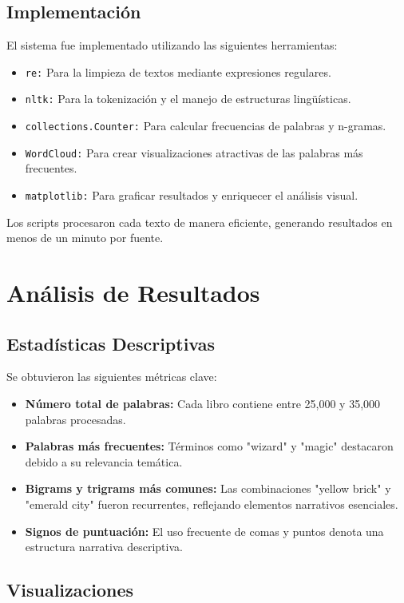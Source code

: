 \documentclass[conference]{IEEEtran}
\begin{document}
\subsection{Implementación}

El sistema fue implementado utilizando las siguientes herramientas:
\begin{itemize}
    \item \texttt{re:} Para la limpieza de textos mediante expresiones regulares.
    \item \texttt{nltk:} Para la tokenización y el manejo de estructuras lingüísticas.
    \item \texttt{collections.Counter:} Para calcular frecuencias de palabras y n-gramas.
    \item \texttt{WordCloud:} Para crear visualizaciones atractivas de las palabras más frecuentes.
    \item \texttt{matplotlib:} Para graficar resultados y enriquecer el análisis visual.
\end{itemize}
Los scripts procesaron cada texto de manera eficiente, generando resultados en menos de un minuto por fuente.


\section{Análisis de Resultados}

\subsection{Estadísticas Descriptivas}

Se obtuvieron las siguientes métricas clave:
\begin{itemize}
    \item \textbf{Número total de palabras:} Cada libro contiene entre 25,000 y 35,000 palabras procesadas.
    \item \textbf{Palabras más frecuentes:} Términos como "wizard" y "magic" destacaron debido a su relevancia temática.
    \item \textbf{Bigrams y trigrams más comunes:} Las combinaciones "yellow brick" y "emerald city" fueron recurrentes, reflejando elementos narrativos esenciales.
    \item \textbf{Signos de puntuación:} El uso frecuente de comas y puntos denota una estructura narrativa descriptiva.
\end{itemize}


\subsection{Visualizaciones}
\end{document}
